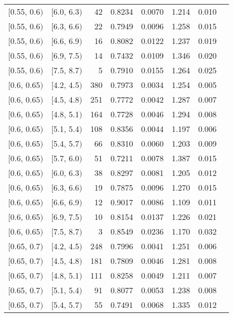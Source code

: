 \begin{longtable}{| l | l | r | r | r | r | r | r |}
        $[$0.55, 0.6$)$ & $[$6.0, 6.3$)$ & 42  & 0.8234 & 0.0070 & 1.214 & 0.010 \\
        $[$0.55, 0.6$)$ & $[$6.3, 6.6$)$ & 22  & 0.7949 & 0.0096 & 1.258 & 0.015 \\
        $[$0.55, 0.6$)$ & $[$6.6, 6.9$)$ & 16  & 0.8082 & 0.0122 & 1.237 & 0.019 \\
        $[$0.55, 0.6$)$ & $[$6.9, 7.5$)$ & 14  & 0.7432 & 0.0109 & 1.346 & 0.020 \\
        $[$0.55, 0.6$)$ & $[$7.5, 8.7$)$ & 5   & 0.7910 & 0.0155 & 1.264 & 0.025 \\
        $[$0.6, 0.65$)$ & $[$4.2, 4.5$)$ & 380 & 0.7973 & 0.0034 & 1.254 & 0.005 \\
        $[$0.6, 0.65$)$ & $[$4.5, 4.8$)$ & 251 & 0.7772 & 0.0042 & 1.287 & 0.007 \\
        $[$0.6, 0.65$)$ & $[$4.8, 5.1$)$ & 164 & 0.7728 & 0.0046 & 1.294 & 0.008 \\
        $[$0.6, 0.65$)$ & $[$5.1, 5.4$)$ & 108 & 0.8356 & 0.0044 & 1.197 & 0.006 \\
        $[$0.6, 0.65$)$ & $[$5.4, 5.7$)$ & 66  & 0.8310 & 0.0060 & 1.203 & 0.009 \\
        $[$0.6, 0.65$)$ & $[$5.7, 6.0$)$ & 51  & 0.7211 & 0.0078 & 1.387 & 0.015 \\
        $[$0.6, 0.65$)$ & $[$6.0, 6.3$)$ & 38  & 0.8297 & 0.0081 & 1.205 & 0.012 \\
        $[$0.6, 0.65$)$ & $[$6.3, 6.6$)$ & 19  & 0.7875 & 0.0096 & 1.270 & 0.015 \\
        $[$0.6, 0.65$)$ & $[$6.6, 6.9$)$ & 12  & 0.9017 & 0.0086 & 1.109 & 0.011 \\
        $[$0.6, 0.65$)$ & $[$6.9, 7.5$)$ & 10  & 0.8154 & 0.0137 & 1.226 & 0.021 \\
        $[$0.6, 0.65$)$ & $[$7.5, 8.7$)$ & 3   & 0.8549 & 0.0236 & 1.170 & 0.032 \\
        $[$0.65, 0.7$)$ & $[$4.2, 4.5$)$ & 248 & 0.7996 & 0.0041 & 1.251 & 0.006 \\
        $[$0.65, 0.7$)$ & $[$4.5, 4.8$)$ & 181 & 0.7809 & 0.0046 & 1.281 & 0.008 \\
        $[$0.65, 0.7$)$ & $[$4.8, 5.1$)$ & 111 & 0.8258 & 0.0049 & 1.211 & 0.007 \\
        $[$0.65, 0.7$)$ & $[$5.1, 5.4$)$ & 91  & 0.8077 & 0.0053 & 1.238 & 0.008 \\
        $[$0.65, 0.7$)$ & $[$5.4, 5.7$)$ & 55  & 0.7491 & 0.0068 & 1.335 & 0.012 \\

\end{longtable}
